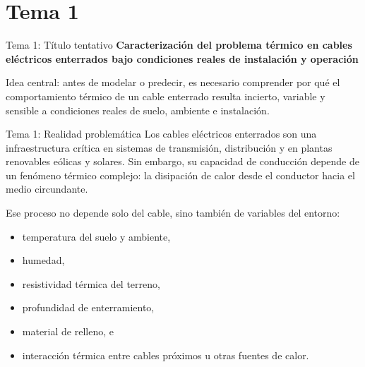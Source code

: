 \documentclass[aspectratio=169]{beamer}
\begin{document}
\section{Tema 1}

\begin{frame}{Tema 1: Título tentativo}
\textbf{{\Large Caracterización del problema térmico en cables eléctricos enterrados bajo condiciones reales de instalación y operación}}

\vspace{0.8em}
\justifying
Idea central: antes de modelar o predecir, es necesario comprender por qué el comportamiento térmico de un cable enterrado resulta incierto, variable y sensible a condiciones reales de suelo, ambiente e instalación.
\end{frame}

\begin{frame}{Tema 1: Realidad problemática}
\justifying
Los cables eléctricos enterrados son una infraestructura crítica en sistemas de transmisión, distribución y en plantas renovables eólicas y solares. Sin embargo, su capacidad de conducción depende de un fenómeno térmico complejo: la disipación de calor desde el conductor hacia el medio circundante.

\vspace{0.5em}
Ese proceso no depende solo del cable, sino también de variables del entorno:
\begin{itemize}[leftmargin=*]
    \item temperatura del suelo y ambiente,
    \item humedad,
    \item resistividad térmica del terreno,
    \item profundidad de enterramiento,
    \item material de relleno, e
    \item interacción térmica entre cables próximos u otras fuentes de calor.
\end{itemize}
\end{frame}
\end{document}

